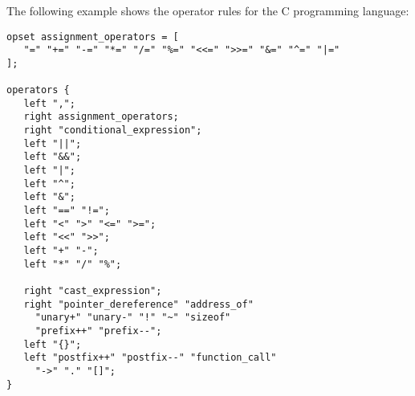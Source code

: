 \begin{grammar}
      \produces {} \lextoken{\{}
	  \lextoken{\}} \\
      \produces {} \lextoken{;} \\
      \produces {}
	  \lextoken{;} \\
      \produces {}  \\
      \produces {}  \\
      \produces {}  \\
      \produces {} \\
      \produces {}  \\
      \produces {} \\
      \produces {} \\
\end{grammar}

\noindent
The following example shows the operator rules for the C
programming language:

\begin{lstlisting}
opset assignment_operators = [
   "=" "+=" "-=" "*=" "/=" "%=" "<<=" ">>=" "&=" "^=" "|="
];

operators {
   left ",";
   right assignment_operators;
   right "conditional_expression";
   left "||";
   left "&&";
   left "|";
   left "^";
   left "&";
   left "==" "!=";
   left "<" ">" "<=" ">=";
   left "<<" ">>";
   left "+" "-";
   left "*" "/" "%";

   right "cast_expression";
   right "pointer_dereference" "address_of"
	 "unary+" "unary-" "!" "~" "sizeof"
	 "prefix++" "prefix--";
   left "{}";
   left "postfix++" "postfix--" "function_call"
	 "->" "." "[]";
}
\end{lstlisting}

\endinput
